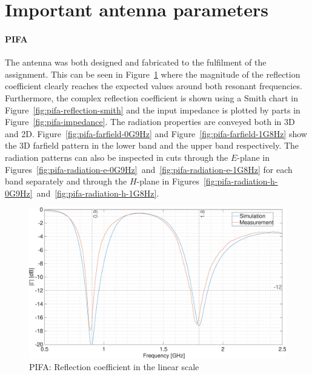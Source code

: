 \documentclass[11pt,a4paper]{article}
\begin{document}
\newpage
    \section{Important antenna parameters}
        \paragraph{PIFA} The antenna was both designed and fabricated to the fulfilment of the assignment. This can be seen in Figure~\ref{fig:pifa-reflection-linear} where the magnitude of the reflection coefficient clearly reaches the expected values around both resonant frequencies. Furthermore, the complex reflection coefficient is shown using a Smith chart in Figure~\ref{fig:pifa-reflection-smith} and the input impedance is plotted by parts in Figure~\ref{fig:pifa-impedance}. The radiation properties are conveyed both in 3D and 2D. Figure~\ref{fig:pifa-farfield-0G9Hz} and Figure~\ref{fig:pifa-farfield-1G8Hz} show the 3D farfield pattern in the lower band and the upper band respectively. The radiation patterns can also be inspected in cuts through the $E$-plane in Figures~\ref{fig:pifa-radiation-e-0G9Hz}~and~\ref{fig:pifa-radiation-e-1G8Hz} for each band separately and through the $H$-plane in Figures~\ref{fig:pifa-radiation-h-0G9Hz}~and~\ref{fig:pifa-radiation-h-1G8Hz}.

        \begin{figure}[!ht]
            \centering
            \includegraphics[width=.8\textwidth]{src/pifa-reflection-linear.eps}
            \caption{\label{fig:pifa-reflection-linear}PIFA: Reflection coefficient in the linear scale}
        \end{figure}
        
\end{document}
